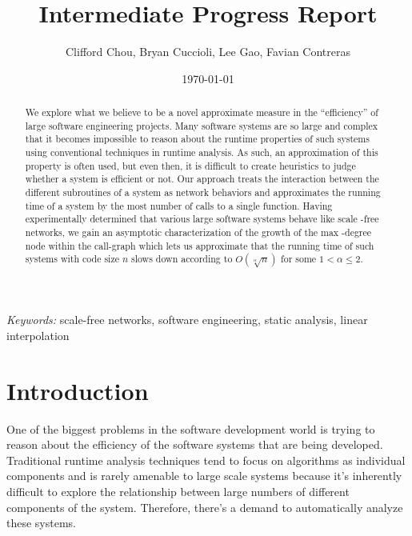 \documentclass[11pt,a4paper]{article}
\author{Clifford Chou, Bryan Cuccioli, Lee Gao, 
Favian Contreras}
\date{\today}
\title{\textbf{Intermediate Progress Report}} %
\begin{document}


\renewcommand{\abstractname}{Abstract} %
\begin{singlespace}
\maketitle
\begin{abstract}
We explore what we believe to be a novel approximate measure in the 
``efficiency'' of large software engineering projects. Many software systems 
are so large and complex that it becomes impossible to reason about the 
runtime properties of such systems using conventional techniques in runtime 
analysis. As such, an approximation of this property is often used, but even 
then, it is difficult to create heuristics to judge whether a system is 
efficient or not. Our approach treats the interaction between the different 
subroutines of a system as network behaviors and approximates the running time 
of a system by the most number of calls to a single function. Having 
experimentally determined that various large software systems behave like scale
-free networks, we gain an asymptotic characterization of the growth of the max
-degree node within the call-graph which lets us approximate that the running 
time of such systems with code size $n$ slows down according to 
$O(\sqrt[\alpha]{n})$ for some $1 < \alpha \le 2$.
\end{abstract}

\hspace*{3,6mm}\textit{Keywords:} {\sf \small  scale-free networks, software 
engineering, static analysis, linear interpolation} %
\end{singlespace}
\vspace{30pt} %


\section*{Introduction}
One of the biggest problems in the software development world is trying to 
reason about the efficiency of the software systems that are being developed. 
Traditional runtime analysis techniques tend to focus on algorithms as 
individual components and is rarely amenable to large scale systems because 
it's inherently difficult to explore the relationship between large numbers of 
different components of the system. Therefore, there's a demand to 
automatically analyze these systems.
\end{document}
